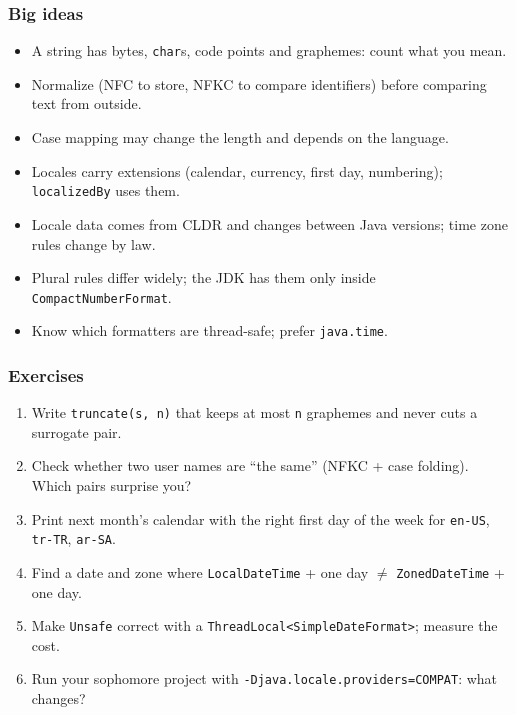 \documentclass[aspectratio=169,10pt,compress]{beamer}
\begin{document}
\begin{frame}[t,fragile] \frametitle{Big ideas}
  \begin{itemize}\small
    \item A string has bytes, \texttt{char}s, code points and graphemes: count what you mean.
    \item Normalize (NFC to store, NFKC to compare identifiers) before comparing text from outside.
    \item Case mapping may change the length and depends on the language.
    \item Locales carry extensions (calendar, currency, first day, numbering); \texttt{localizedBy} uses them.
    \item Locale data comes from CLDR and changes between Java versions; time zone rules change by law.
    \item Plural rules differ widely; the JDK has them only inside \texttt{CompactNumberFormat}.
    \item Know which formatters are thread-safe; prefer \texttt{java.time}.
  \end{itemize}
\end{frame}




\begin{frame}[t,fragile] \frametitle{Exercises}
  \begin{enumerate}\small
    \item Write \texttt{truncate(s, n)} that keeps at most \texttt{n} graphemes and never cuts a surrogate pair.
    \item Check whether two user names are ``the same'' (NFKC + case folding). Which pairs surprise you?
    \item Print next month's calendar with the right first day of the week for \texttt{en-US}, \texttt{tr-TR}, \texttt{ar-SA}.
    \item Find a date and zone where \texttt{LocalDateTime} + one day $\neq$ \texttt{ZonedDateTime} + one day.
    \item Make \texttt{Unsafe} correct with a \texttt{ThreadLocal<SimpleDateFormat>}; measure the cost.
    \item Run your sophomore project with \texttt{-Djava.locale.providers=COMPAT}: what changes?
  \end{enumerate}
\end{frame}




\begin{frame}[t,fragile]
	\begin{center}
		\vspace{4cm}
	\end{center}
\end{frame}
\end{document}

